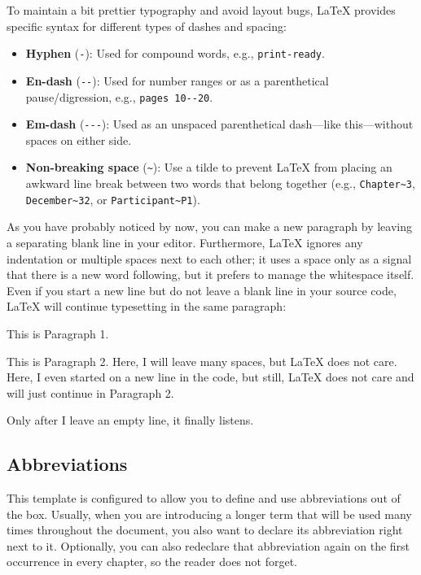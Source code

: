 To maintain a bit prettier typography and avoid layout bugs, \LaTeX{} provides specific syntax for different types of
dashes and spacing:
\begin{itemize}
    \item \textbf{Hyphen} (\verb|-|): Used for compound words, e.g., \verb|print-ready|.
    \item \textbf{En-dash} (\verb|--|): Used for number ranges or as a parenthetical pause/digression,
    e.g., \verb|pages 10--20|.
    \item \textbf{Em-dash} (\verb|---|): Used as an unspaced parenthetical dash---like this---without spaces on
    either side.
    \item \textbf{Non-breaking space} (\verb|~|): Use a tilde to prevent \LaTeX{} from placing an awkward line
    break between two words that belong together (e.g., \verb|Chapter~3|, \verb|December~32|, or \verb|Participant~P1|).
\end{itemize}

As you have probably noticed by now, you can make a new paragraph by leaving a separating blank line in your editor.
Furthermore, \LaTeX{} ignores any indentation or multiple spaces next to each other; it uses a space only as a
signal that there is a new word following, but it prefers to manage the whitespace itself. Even if you start a new line
but do not leave a blank line in your source code, \LaTeX{} will continue typesetting in the same paragraph:
\begin{displayquote}
    This is Paragraph 1.

    This is Paragraph 2. Here, I will leave many spaces,                         but \LaTeX{} does not care.
    Here, I even started on a new line in the code, but still, \LaTeX{} does not care and will just continue in
    Paragraph 2.

    Only after I leave an empty line, it finally listens.
\end{displayquote}

\subsection{Abbreviations}

This template is configured to allow you to define and use abbreviations out of the box. Usually, when you are
introducing a longer term that will be used many times throughout the document, you also want to declare its
abbreviation right next to it. Optionally, you can also redeclare that abbreviation again on the first occurrence in
every chapter, so the reader does not forget.

